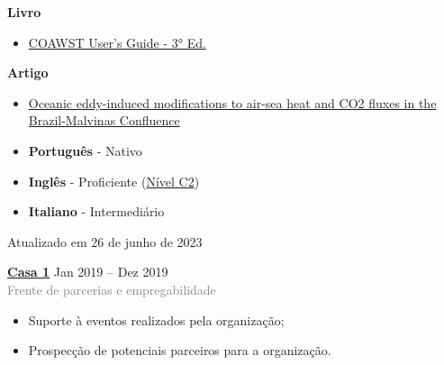 \documentclass[9pt]{developercv} %
\begin{document}
\begin{minipage}[t]{0.3\textwidth}
	\vspace{-\baselineskip} %
	
	
	\textbf{Livro} %
	\textcolor{gray}{}
	 \begin{itemize}
		\item \small\textcolor{bleu_cite}{\href{http://mtc-m21c.sid.inpe.br/col/sid.inpe.br/mtc-m21c/2020/10.02.15.11/doc/publicacao.pdf}{COAWST User's Guide - 3° Ed.}}
	 \end{itemize}
	 \textbf{Artigo}
	 \begin{itemize}
		\item \small\textcolor{bleu_cite}{\href{https://www.nature.com/articles/s41598-021-89985-9}{Oceanic eddy-induced modifications to air-sea heat and CO2 fluxes in the Brazil-Malvinas Confluence}}
	 \end{itemize}  
\end{minipage}
\hfill
\begin{minipage}[t]{0.3\textwidth}
	\vspace{-\baselineskip} %

	\vspace{-0.3cm}
	\begin{itemize}
	\itemsep0em
	\item \textbf{Português} - Nativo
	\item \textbf{Inglês} - Proficiente (\href{https://www.efset.org/cert/PrWqbW}{\textcolor{bleu_cite}{Nível C2}})
	\item \textbf{Italiano} - Intermediário 
	\end{itemize}
	\vspace{1.3cm}
	
	\centering\tiny Atualizado em 26 de junho de 2023
\end{minipage}
\hfill
\begin{minipage}[t]{0.3\textwidth}
	\vspace{-\baselineskip} %


	\textbf{\textcolor{bleu_cite}{\href{https://www.casaum.org/}{Casa 1}} } \hspace{1.cm} Jan 2019 --  Dez 2019\\
	\textcolor{gray}{Frente de parcerias e empregabilidade}
	\begin{itemize}
		\item Suporte à eventos realizados pela organização;
		\item Prospecção de potenciais parceiros para a organização.
	\end{itemize}
\end{minipage}


\end{document}
